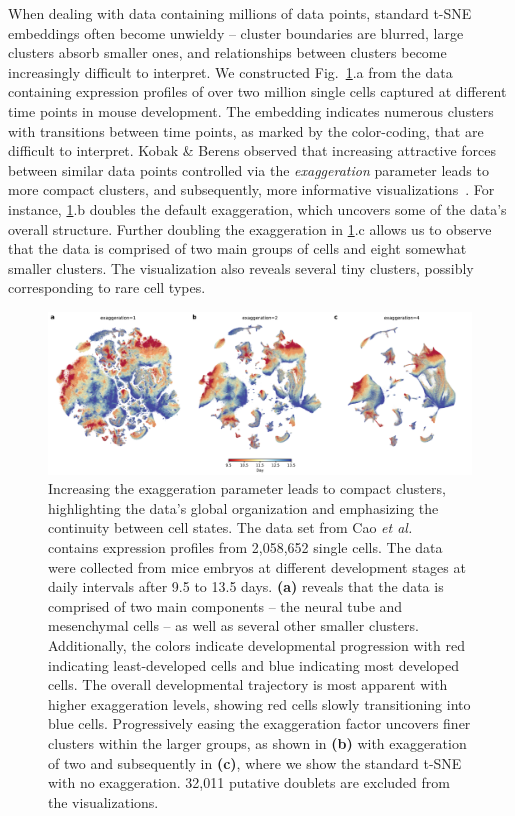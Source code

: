 \documentclass[twocolumn]{bmcart}
\begin{document}
When dealing with data containing millions of data points, standard t-SNE
embeddings often become unwieldy -- cluster boundaries are blurred, large
clusters absorb smaller ones, and relationships between clusters become
increasingly difficult to interpret. We constructed Fig.~\ref{fig:cao}.a from
the data containing expression profiles of over two million single cells
captured at different time points in mouse development. The embedding indicates
numerous clusters with transitions between time points, as marked by the
color-coding, that are difficult to interpret. Kobak \& Berens observed that
increasing attractive forces between similar data points controlled via the
\textit{exaggeration} parameter leads to more compact clusters, and
subsequently, more informative visualizations~\cite{kobak2019art}. For instance,
\ref{fig:cao}.b doubles the default exaggeration, which uncovers some of the
data's overall structure. Further doubling the exaggeration in \ref{fig:cao}.c
allows us to observe that the data is comprised of two main groups of cells and
eight somewhat smaller clusters. The visualization also reveals several tiny
clusters, possibly corresponding to
rare cell types.

\begin{figure}[htbp]
  \includegraphics[width=\textwidth]{cao2019}
  \caption{\label{fig:cao}
Increasing the exaggeration parameter leads to compact clusters, highlighting the data's global organization and emphasizing the continuity between cell states. The data set from Cao \textit{et al.}~\cite{cao2019single} contains expression profiles from 2,058,652 single cells. The data were collected from mice embryos at different development stages at daily intervals after 9.5 to 13.5 days. \textbf{(a)} reveals that the data is comprised of two main components -- the neural tube and mesenchymal cells -- as well as several other smaller clusters. Additionally, the colors indicate developmental progression with red indicating least-developed cells and blue indicating most developed cells. The overall developmental trajectory is most apparent with higher exaggeration levels, showing red cells slowly transitioning into blue cells. Progressively easing the exaggeration factor uncovers finer clusters within the larger groups, as shown in
\textbf{(b)} with exaggeration of two and subsequently in \textbf{(c)}, where we show the standard t-SNE with no exaggeration. 32,011 putative doublets are excluded from the visualizations.
}
\end{figure}
\end{document}

